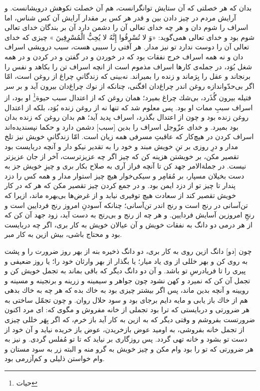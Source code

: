 بدان كه هر خصلتى كه آن ستايش توانگرانست، هم آن خصلت نكوهش درويشانست. و آرايش مردم در چيز دادن بين و قدر هر كس بر مقدار آرايش آن كس شناس، اما اسراف را شوم دان و هر چه خداى تعالى آن را دشمن دارد آن بر بندگان خداى تعالى شوم بود و خداى تعالى همى‌گويد: «وَ لا تُسْرِفُوا إِنَّهُ لا يُحِبُّ الْمُسْرِفِينَ » چيزى كه خداى تعالى آن را دوست ندارد تو نيز مدار. هر آفتى را سببى هست، سبب درويشى اسراف دان و نه همه اسراف خرج نفقات بود كه در خوردن و در گفتن و در كردن و در همه شغل بُوَد، در جمله‌ی كارها اسراف مذموم است از انچه اسراف تن را بكاهد و نفس را برنجاند و عقل را بِرَماند و زنده را بميراند. نه‌بينى كه زندگانیِ چراغ از روغن است، امّا اگر بى‌حدّ‌و‌اندازه روغن اندر چراغ‌دان افگنى، چنانكه از نوك چراغ‌دان بيرون آيد و بر سر فتيله بيرون گُذَرد، بى‌شك چراغ بميرد؛ همان روغن كه از اعتدال سبب حيوة\footnote{حیات} او بود، از اسراف سببِ ممات او بود. پس معلوم شد كه تنها نه از روغن زنده بُوَد، بلكه از اعتدال روغن زنده بود و چون از اعتدال بگذرد، اسراف پديد آيد؛ هم بدان روغن كه زنده بدان بود بميرد. و خداى عزّوجل اسراف را بدين [سبب] دشمن دارد و حكما نپسنديده‌اند اسراف كردن در هيچ‌كار كه عاقبتِ مسرفى همه زيان است. امّا زندگانىِ خويش نيز تلخ مدار و درِ روزى بر تنِ خويش مبند و خود را به تقدير نيكو دار و آنچه دربايست بود تقصير مكن، بر خويشتن هزينه كن كه چيز اگر چه عزيزترست، آخر از جان عزيزتر نيست. در جملة‌الامر جهد كن تا آنچه فراز آرى به صلاح بكار برى و چيزِ خويش جز به دست بخيلان مسپار، بر مُقامِر و سيكى‌خوار هيچ چيز استوار مدار و همه كس را دزد پندار تا چيز تو از دزد ايمن بود. و در جمع كردن چيز تقصير مكن كه هر كه در كار خويش تقصير كند از سعادت هيچ توفيرى نيابد و از غرض‌ها بى‌بهره ماند، ازيرا كه تن‌آسانى در رنج است و رنج اندر تن‌آسانى؛ چنانكه آسودنِ امروز رنج فردايين است و رنجِ امروزين آسايش فردايين. و هر چه از رنج و بى‌رنج به دست آيد، زود جهد آن كن كه از هر درمى دو دانگ به نفقات خويش و آن عيالان خويش به كار برى، اگر چه دربايست بود و محتاج باشى، بيش ازين به كار مبر.

چون [دو] دانگ ازين روى به كار برى، دو دانگ ذخيره بنه از بهر روز ضرورت را و پشت به روى كن و بهر خللى از وى ياد ميار؛ يا بگذار از بهر وارثان خود را؛ يا روز ضعيفى و پيرى را تا فريادرسِ تو باشد.  و آن دو دانگ ديگر كه باقى بماند به تجمل خويش كن و تجمل آن كن كه نميرد و كهن نشود چون جواهر و سيمينه و زرينه و برنجينه و مسينه و رويينه و آنچه بدين ماند، پس اگر بيشتر چيزى بود به خاك بده كه هر چه به خاك بدهى هم از خاك باز يابى و مايه دايم بر‌جاى بود و سود حلال روان. و چون تجمّل ساختى به هر ضرورتى و دربايستى كه ترا بود تجملى از خانه مفروش و مگوى كه: اى مرد اكنون ضرورتست بفروشم و وقتى ديگر كه به ازين به كار آيد باز خرم، كه اگر بِهَر خللى چيزى از تجمل خانه بفروشى، به اوميد عوض باز‌خريدن، عوض باز خريده نيايد و آن خود از دست تو بشود و خانه تهى گردد. پس روزگارى بر نيايد كه تا تو مُفلس گردى. و نيز به هر ضرورتى كه تو را بود وام مكن و چيز خويش به گرو منه و البته زر به سود مستان و وام خواستن ذليلى و كم‌آزرمى بود.

